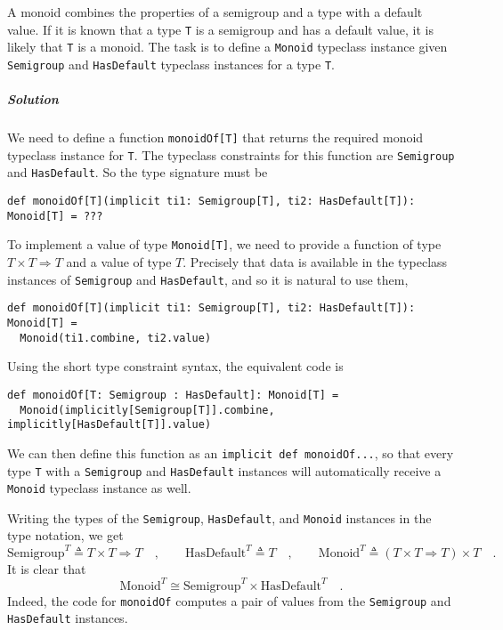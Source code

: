 A monoid combines the properties of a semigroup and a type with a
default value. If it is known that a type \lstinline!T! is a semigroup
and has a default value, it is likely that \lstinline!T! is a monoid.
The task is to define a \lstinline!Monoid! typeclass instance given
\lstinline!Semigroup! and \lstinline!HasDefault! typeclass instances
for a type \lstinline!T!.

\subparagraph{Solution}

We need to define a function \lstinline!monoidOf[T]! that returns
the required monoid typeclass instance for \lstinline!T!. The typeclass
constraints for this function are \lstinline!Semigroup! and \lstinline!HasDefault!.
So the type signature must be
\begin{lstlisting}
def monoidOf[T](implicit ti1: Semigroup[T], ti2: HasDefault[T]): Monoid[T] = ???
\end{lstlisting}
To implement a value of type \lstinline!Monoid[T]!, we need to provide
a function of type $T\times T\Rightarrow T$ and a value of type $T$.
Precisely that data is available in the typeclass instances of \lstinline!Semigroup!
and \lstinline!HasDefault!, and so it is natural to use them,
\begin{lstlisting}
def monoidOf[T](implicit ti1: Semigroup[T], ti2: HasDefault[T]): Monoid[T] =
  Monoid(ti1.combine, ti2.value)
\end{lstlisting}
Using the short type constraint syntax, the equivalent code is
\begin{lstlisting}
def monoidOf[T: Semigroup : HasDefault]: Monoid[T] =
  Monoid(implicitly[Semigroup[T]].combine, implicitly[HasDefault[T]].value)
\end{lstlisting}
We can then define this function as an \lstinline!implicit def monoidOf...!,
so that every type \lstinline!T! with a \lstinline!Semigroup! and
\lstinline!HasDefault! instances will automatically receive a \lstinline!Monoid!
typeclass instance as well.

Writing the types of the \lstinline!Semigroup!, \lstinline!HasDefault!,
and \lstinline!Monoid! instances in the type notation, we get
\[
\text{Semigroup}^{T}\triangleq T\times T\Rightarrow T\quad,\quad\quad\text{HasDefault}^{T}\triangleq T\quad,\quad\quad\text{Monoid}^{T}\triangleq\left(T\times T\Rightarrow T\right)\times T\quad.
\]
It is clear that
\[
\text{Monoid}^{T}\cong\text{Semigroup}^{T}\times\text{HasDefault}^{T}\quad.
\]
Indeed, the code for \lstinline!monoidOf! computes a pair of values
from the \lstinline!Semigroup! and \lstinline!HasDefault! instances. 


